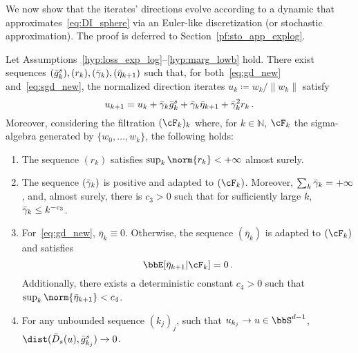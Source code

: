 We now show that the iterates’ directions evolve according to a dynamic that approximates~\eqref{eq:DI_sphere} via an Euler-like discretization (or stochastic approximation). The proof is deferred to Section~\ref{pf:sto_app_explog}.
  \begin{proposition}\label{prop:stoch_approx_exp_log}
    Let Assumptions~\ref{hyp:loss_exp_log}--\ref{hyp:marg_lowb} hold. There exist sequences $(\bar{g}_k^s), (r_k), (\bar{\gamma}_k), (\bar{\eta}_{k+1})$ such that, for both~\eqref{eq:gd_new} and~\eqref{eq:sgd_new}, the normalized direction iterates $u_k \coloneqq w_k/\lVert w_k \rVert$ satisfy
    \begin{equation}\label{eq:stoch_app_u}
      u_{k+1} = u_k + \bar{\gamma}_k\bar{g}_k^s + \bar{\gamma}_k \bar{\eta}_{k+1} + \bar{\gamma}_k^2 r_k\, .
    \end{equation}
    Moreover, considering the filtration $(\cF_k)_k$ where, for $k \in \mathbb{N}$, $\cF_k$ the sigma-algebra generated by $\{ w_0,\ldots,w_k\}$, the following holds:
    \begin{enumerate}
      \item\label{pr_res:rk} The sequence $(r_k)$ satisfies $\sup_{k}\norm{r_k} < + \infty$ almost surely.
      \item\label{pr_res:gammak} The sequence $(\bar{\gamma}_k)$ is positive and adapted to $(\cF_k)$. Moreover, $\sum_{k} \bar{\gamma}_k = + \infty$, and, almost surely, there is $c_3>0$ such that for sufficiently large $k$, $\bar{\gamma}_k \leq k^{-c_3}$.
      \item\label{pr_res:etak} For~\eqref{eq:gd_new}, $\bar{\eta}_{k} \equiv 0$. Otherwise, the sequence $(\bar{\eta}_{k})$ is adapted to $(\cF_k)$ and satisfies 
      \begin{equation*}
      \bbE[\bar{\eta}_{k+1} |\cF_k] = 0 \,.
      \end{equation*}
      Additionally, there exists a deterministic constant $c_4>0$ such that $\sup_{k} \norm{\bar{\eta}_{k+1}} < c_4$.
      \item\label{pr_res:barD} For any unbounded sequence $(k_j)_j$, such that $u_{k_j} \to u \in \bbS^{d-1}$, $\dist(\bar{D}_s(u), \bg^s_{k_j}) \rightarrow 0$. 
    \end{enumerate}
  \end{proposition}
